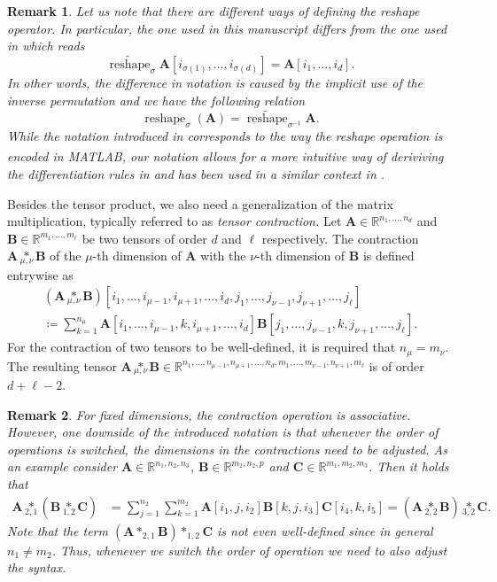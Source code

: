 \documentclass[11pt,reqno]{amsart}
\numberwithin{equation}{section}
\theoremstyle{plain}
\newtheorem{remark}{Remark}
\newcommand{\R}{\mathbb{R}}
\DeclareMathOperator{\reshape}{reshape}
\newcommand{\tenp}[2]{\underset{#1,#2}{*}}
\newcommand{\Matlab}{MATLAB\textsuperscript{\textregistered}}
\begin{document}
\begin{remark}
  Let us note that there are different ways of defining the reshape operator. In particular, the one used in this manuscript differs from the one used in \cite{Wol19,Sal22} which reads 
  \[
    \widetilde{\reshape}_\sigma \mathbf{A}[i_{\sigma(1)},\dots,i_{\sigma(d)}] = \mathbf{A}[i_1,\dots,i_d].
  \]
  In other words, the difference in notation is caused by the implicit use of the inverse permutation and we have the following relation
  \[
    \reshape_\sigma(\mathbf{A}) = \widetilde{\reshape}_{\sigma^{-1}} \mathbf{A}.
  \]
  While the notation introduced in \cite{Wol19,Sal22} corresponds to the way the reshape operation is encoded in \Matlab, our notation allows for a more intuitive way of deriviving the differentiation rules in  and has been used in a similar context in \cite{BreKP19}.
\end{remark}
Besides the tensor product, we also need a generalization of the matrix multiplication, typically referred to as \emph{tensor contraction.}
Let $\mathbf{A}\in \R^{n_1,\dots,n_d}$ and $\mathbf{B}\in \R^{m_1,\dots,m_\ell}$ be two tensors of order $d$ and $\ell$ respectively. The contraction $\mathbf{A}\tenp{\mu}{\nu} \mathbf{B}$ of the $\mu$-th dimension of $\mathbf{A}$ with the $\nu$-th  dimension of $\mathbf{B}$ is defined entrywise as
  \begin{multline*}
    \left(\mathbf{A}\tenp{\mu}{\nu} \mathbf{B}\right)[i_1,\dots,i_{\mu-1},i_{\mu+1},\dots,i_d,j_1,\dots,j_{\nu-1},j_{\nu+1},\dots,j_\ell] \\
    \coloneqq \sum_{k=1}^{n_\mu} \mathbf{A}[i_1,\dots,i_{\mu-1},k,i_{\mu+1},\dots,i_d] \mathbf{B}[j_1,\dots,j_{\nu-1},k,j_{\nu+1},\dots, j_\ell].
  \end{multline*}
For the contraction of two tensors to be well-defined,  it is required that $n_\mu=m_\nu$.
The resulting tensor $\mathbf{A}\tenp{\mu}{\nu} \mathbf{B}\in \R^{n_1,\dots,n_{\mu-1},n_{\mu+1},\dots, n_d,m_1,\dots,m_{\nu-1},n_{\nu+1},m_\ell}$ is of order $d+\ell-2$.
\begin{remark}
    For fixed dimensions, the contraction operation is associative. However, one downside of the introduced notation is that whenever the order of operations is switched, the dimensions in the contractions need to be adjusted. 
As an example consider $\mathbf{A}\in\R^{n_1,n_2,n_3}$, $\mathbf{B}\in\R^{m_2,n_2,p}$ and $\mathbf{C}\in\R^{m_1,m_2,m_3}$. Then it holds that
\begin{align*}
  \mathbf{A}\tenp{2}{1}(\mathbf{B}\tenp{1}{2}\mathbf{C})
  & = \sum_{j=1}^{n_2} \sum_{k=1}^{m_2} \mathbf{A}[i_1,j,i_2]\mathbf{B}[k,j,i_3]\mathbf{C}[i_4,k,i_5]
  = \left(\mathbf{A}\tenp{2}{2}\mathbf{B}\right)\tenp{3}{2}\mathbf{C}.
\end{align*}
Note that the term  $(\mathbf{A}*_{2,1}\mathbf{B})*_{1,2}\mathbf{C}$ is not even well-defined since in general $n_1\neq m_2$. Thus, whenever we switch the order of operation we need to also adjust the syntax.
\end{remark}
\end{document}
